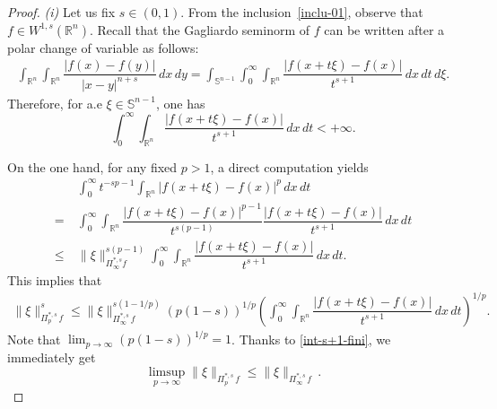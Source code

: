 \documentclass[11pt, reqno]{article}
\theoremstyle{definition}
\numberwithin{equation}{section}
\newtheorem{remark}[theorem]{Remark}
\newcommand{\R}{\mathbb{R}}
\newcommand{\Sphere}{\mathbb{S}^{n - 1}}
\begin{document}

\begin{proof}
\textit{(i)} 
Let us fix $s \in (0, 1)$.
From the inclusion~\eqref{inclu-01}, observe that $f \in W^{1, s}(\R^n)$.
Recall that the Gagliardo seminorm of $f$ can be written after a polar change of variable as follows: 
\begin{align*}
	\int_{\R^n} \int_{\R^n} \dfrac{|f(x) - f(y)|}{|x - y|^{n + s}} \, dx \, dy = \int_{\Sphere} \int_0^\infty \int_{\R^n} \dfrac{|f(x + t\xi) - f(x)|}{t^{s + 1}} \, dx \, dt \, d\xi.
\end{align*}
Therefore, for a.e $\xi \in \Sphere$, one has
	\begin{equation}\label{int-s+1-fini}
		\int_0^\infty \int_{\R^n} \dfrac{|f(x + t \xi) - f(x)|}{t^{s + 1}} \, dx \, dt < + \infty.
	\end{equation}

\smallskip

On the one hand, for any fixed $p > 1$, a direct computation yields
\begin{align*}
    & ~ \int_0^\infty t^{-sp - 1} \int_{\R^n} |f(x + t \xi) - f(x)|^p \,dx\,dt \\
    = & ~ \int_0^\infty \int_{\R^n} \dfrac{|f(x + t\xi) - f(x)|^{p - 1}}{t^{s(p - 1)}} \dfrac{|f(x + t\xi) - f(x)|}{t^{s + 1}} \, dx\,dt  \\
    \leq & ~ \| \xi \|^{s(p - 1)}_{\Pi^{\ast, s}_\infty f} \int_0^\infty \int_{\R^n}  \dfrac{|f(x + t\xi) - f(x)|}{t^{s + 1}} \, dx \, dt.
\end{align*}
This implies that 
    \begin{align*}
        \| \xi \|^s_{\Pi^{\ast, s}_p \, f} \leq  \| \xi \|^{s \left(1 - 1/p\right)}_{\Pi^{\ast, s}_\infty \, f}
        (p(1 - s))^{1/p}
        \left( \int_0^\infty \int_{\R^n}  \dfrac{|f(x + t\xi) - f(x)|}{t^{s + 1}} \, dx \, dt\right)^{1/p}.
    \end{align*}
Note that $\textstyle\lim_{p \to \infty} (p(1 - s))^{1/p} = 1$.
Thanks to \eqref{int-s+1-fini}, we immediately get
    \begin{equation}\label{limsup-01}
        \limsup_{p \to \infty} \| \xi \|_{\Pi^{\ast, s}_p \, f} \leq \| \xi \|_{\Pi^{\ast, s}_\infty \, f} \,.
    \end{equation}


\end{proof}
\end{document}
